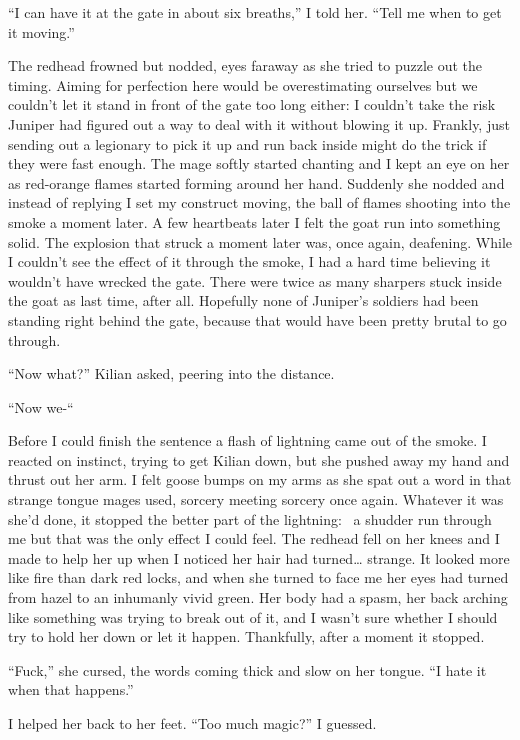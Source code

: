 \documentclass[12pt, openany]{book}
\begin{document}
“I can have it at the gate in about six breaths,” I told her. “Tell me when to get it moving.”

The redhead frowned but nodded, eyes faraway as she tried to puzzle out the timing. Aiming for perfection here would be overestimating ourselves but we couldn’t let it stand in front of the gate too long either: I couldn’t take the risk Juniper had figured out a way to deal with it without blowing it up. Frankly, just sending out a legionary to pick it up and run back inside might do the trick if they were fast enough. The mage softly started chanting and I kept an eye on her as red-orange flames started forming around her hand. Suddenly she nodded and instead of replying I set my construct moving, the ball of flames shooting into the smoke a moment later. A few heartbeats later I felt the goat run into something solid. The explosion that struck a moment later was, once again, deafening. While I couldn’t see the effect of it through the smoke, I had a hard time believing it wouldn’t have wrecked the gate. There were twice as many sharpers stuck inside the goat as last time, after all. Hopefully none of Juniper’s soldiers had been standing right behind the gate, because that would have been pretty brutal to go through.

“Now what?” Kilian asked, peering into the distance.

“Now we-“

Before I could finish the sentence a flash of lightning came out of the smoke. I reacted on instinct, trying to get Kilian down, but she pushed away my hand and thrust out her arm. I felt goose bumps on my arms as she spat out a word in that strange tongue mages used, sorcery meeting sorcery once again. Whatever it was she’d done, it stopped the better part of the lightning:  a shudder run through me but that was the only effect I could feel. The redhead fell on her knees and I made to help her up when I noticed her hair had turned… strange. It looked more like fire than dark red locks, and when she turned to face me her eyes had turned from hazel to an inhumanly vivid green. Her body had a spasm, her back arching like something was trying to break out of it, and I wasn’t sure whether I should try to hold her down or let it happen. Thankfully, after a moment it stopped.

“Fuck,” she cursed, the words coming thick and slow on her tongue. “I hate it when that happens.”

I helped her back to her feet. “Too much magic?” I guessed.
\end{document}
